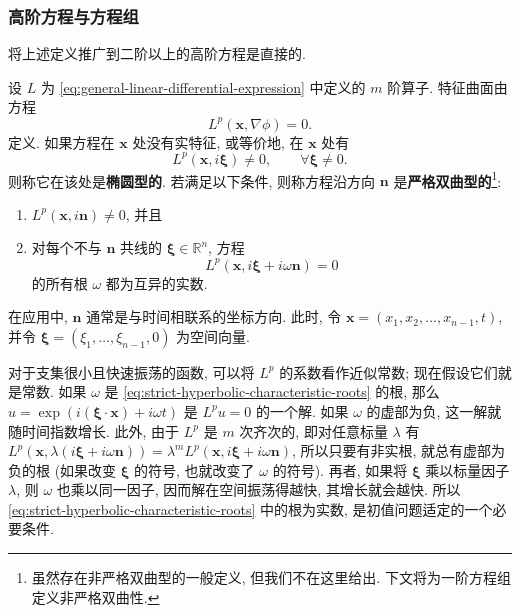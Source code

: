 \subsubsection{高阶方程与方程组}\label{subsec:higher-order-systems}

将上述定义推广到二阶以上的高阶方程是直接的.

\begin{Definition}
\label{def:higher-order-pde-type}
设 $L$ 为 \eqref{eq:general-linear-differential-expression} 中定义的 $m$ 阶算子. 特征曲面由方程
\begin{equation}\label{eq:higher-order-characteristic-surface}
L^p(\bm{x},\nabla\phi)=0.
\end{equation}
定义. 如果方程在 $\bm{x}$ 处没有实特征, 或等价地, 在 $\bm{x}$ 处有
\begin{equation}\label{eq:higher-order-ellipticity}
L^p(\bm{x},i\bm{\xi})\ne0,\qquad\forall\bm{\xi}\ne0.
\end{equation}
则称它在该处是\textbf{椭圆型的}. 若满足以下条件, 则称方程沿方向 $\bm{n}$ 是\textbf{严格双曲型的}\footnote{虽然存在非严格双曲型的一般定义, 但我们不在这里给出. 下文将为一阶方程组定义非严格双曲性.}:
\begin{enumerate}
\item $L^p(\bm{x},i\bm{n})\ne0$, 并且
\item 对每个不与 $\bm{n}$ 共线的 $\bm{\xi}\in\mathbb{R}^n$, 方程
\begin{equation}\label{eq:strict-hyperbolic-characteristic-roots}
L^p(\bm{x},i\bm{\xi}+i\omega\bm{n})=0
\end{equation}
的所有根 $\omega$ 都为互异的实数.\end{enumerate}
\end{Definition}

在应用中, $\bm{n}$ 通常是与时间相联系的坐标方向. 此时, 令 $\bm{x}=(x_1,x_2,\ldots,x_{n-1},t)$, 并令 $\bm{\xi}=(\xi_1,\ldots,\xi_{n-1},0)$ 为空间向量.

对于支集很小且快速振荡的函数, 可以将 $L^p$ 的系数看作近似常数; 现在假设它们就是常数. 如果 $\omega$ 是 \eqref{eq:strict-hyperbolic-characteristic-roots} 的根, 那么 $u=\exp(i(\bm{\xi}\cdot\bm{x})+i\omega t)$ 是 $L^pu=0$ 的一个解. 如果 $\omega$ 的虚部为负, 这一解就随时间指数增长. 此外, 由于 $L^p$ 是 $m$ 次齐次的, 即对任意标量 $\lambda$ 有 $L^p(\bm{x},\lambda(i\bm{\xi}+i\omega\bm{n}))=\lambda^mL^p(\bm{x},i\bm{\xi}+i\omega\bm{n})$, 所以只要有非实根, 就总有虚部为负的根 (如果改变 $\bm{\xi}$ 的符号, 也就改变了 $\omega$ 的符号). 再者, 如果将 $\bm{\xi}$ 乘以标量因子 $\lambda$, 则 $\omega$ 也乘以同一因子, 因而解在空间振荡得越快, 其增长就会越快. 所以 \eqref{eq:strict-hyperbolic-characteristic-roots} 中的根为实数, 是初值问题适定的一个必要条件.

